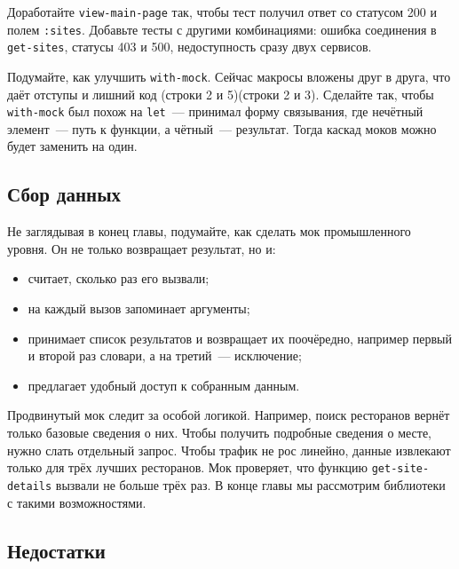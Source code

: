 \fi

Доработайте \verb|view-main-page| так, чтобы тест получил ответ со статусом
200 и полем \verb|:sites|. Добавьте тесты с другими комбинациями: ошибка
соединения в \verb|get-sites|, статусы 403 и 500, недоступность сразу двух
сервисов.

Подумайте, как улучшить \verb|with-mock|. Сейчас макросы вложены друг в друга,
что даёт отступы и лишний код \ifnarrow(строки 2 и 5)\else(строки 2 и 3)\fi. Сделайте так, чтобы
\verb|with-mock| был похож на \verb|let|~--- принимал форму связывания, где
нечётный элемент~--- путь к функции, а чётный~--- результат. Тогда каскад моков
можно будет заменить на один.

\subsection{Сбор данных}


Не заглядывая в конец главы, подумайте, как сделать мок промышленного уровня. Он
не только возвращает результат, но и:

\begin{itemize}

\item
  считает, сколько раз его вызвали;

\item
  на каждый вызов запоминает аргументы;

\item
  принимает список результатов и возвращает их поочёредно, например первый и
  второй раз словари, а на третий~--- исключение;

\item
  предлагает удобный доступ к собранным данным.

\end{itemize}

Продвинутый мок следит за особой логикой. Например, поиск ресторанов вернёт
только базовые сведения о них. Чтобы получить подробные сведения о месте, нужно
слать отдельный запрос. Чтобы трафик не рос линейно, данные извлекают только для
трёх лучших ресторанов. Мок проверяет, что функцию \verb|get-site-details|
вызвали не больше трёх раз. В конце главы мы рассмотрим библиотеки с такими
возможностями.

\subsection{Недостатки}

